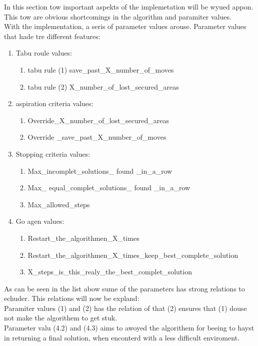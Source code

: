 \begin{enumerate}
In this section tow important aspekts of the implemetation will be wyued  appon.
This tow are obvious shortcomings in the algorithm and paramiter values.\\
With the implementation, a seris of parameter values arouse. Parameter values that hade tre different features: 
\begin{enumerate}
\item Tabu roule values:
\begin{enumerate}
\item tabu rule (1)  save\_past\_X\_number\_of\_moves 
\item tabu rule (2)  X\_number\_of\_lost\_secured\_areas
\end{enumerate} 
\item aspiration criteria values:
\begin{enumerate}
\item Override\_X\_number\_of\_lost\_secured\_areas
\item Override \_save\_past\_X\_number\_of\_moves
\end{enumerate} 
\item Stopping criteria values:
\begin{enumerate}
\item Max\_incomplet\_solutions\_ found \_in\_a\_row
\item Max\_ equal\_complet\_solutions\_ found \_in\_a\_row
\item Max\_allowed\_steps
\end{enumerate} 
\item Go agen values:
\begin{enumerate}
\item Restart\_the\_algorithmen\_X\_times
\item Restart\_the\_algorithmen\_X\_times\_keep\_best\_complete\_solution
\item X\_steps\_is\_this\_realy\_the\_best\_complet\_solution
\end{enumerate} 
\end{enumerate} 
As can be seen in the list abow sume of the parameters has strong relations to echuder. 
This relations will now be expland:\\
Paramiter values (1) and (2) has the relation of that (2) ensures that (1) douse not make the algorithem to get stuk.\\
Parameter valu (4.2) and (4.3) aims to awoyed the algorithem for beeing to hayst in returning a final solution, when enconterd with a less difficult enviroment.\\

\end{enumerate}
